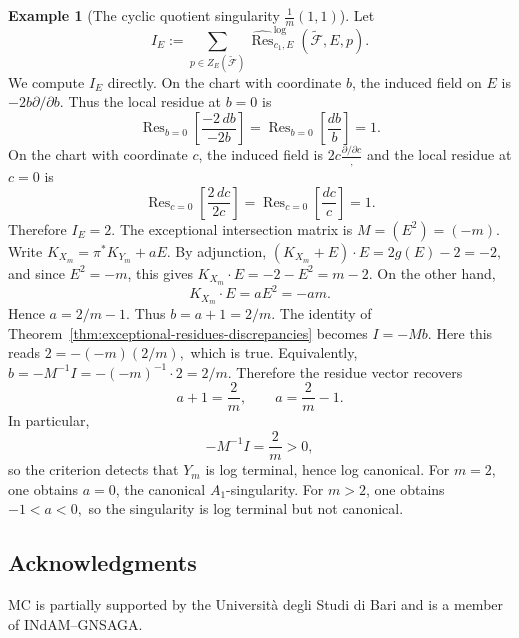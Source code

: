 \documentclass[12pt,reqno,a4paper]{amsart}
\numberwithin{equation}{section}
\theoremstyle{plain}
\theoremstyle{definition}
\newtheorem{example}[example]{Example}
\begin{document}
\begin{example}[The cyclic quotient singularity \(\frac{1}{m}(1,1)\)]
Let
\[
I_E:=
\sum_{p\in Z_E(\widetilde{\mathcal F})}
\widehat{\operatorname{Res}}^{\log}_{c_1,E}
(\widetilde{\mathcal F},E,p).
\]
We compute \(I_E\) directly. On the chart with coordinate \(b\), the induced
field on \(E\) is
$
-2b \partial/\partial b.
$
Thus the local residue at \(b=0\) is
\[
\operatorname{Res}_{b=0}
\left[
\frac{-2\,db}{-2b}
\right]
=
\operatorname{Res}_{b=0}\left[\frac{db}{b}\right]
=
1.
\]
On the chart with coordinate \(c\), the induced field is
$
2c\frac{\partial/\partial c},
$
and the local residue at \(c=0\) is
\[
\operatorname{Res}_{c=0}
\left[
\frac{2\,dc}{2c}
\right]
=
\operatorname{Res}_{c=0}\left[\frac{dc}{c}\right]
=
1.
\]
Therefore
$
I_E=2.$
The exceptional intersection matrix is
$
M=(E^2)=(-m).
$
Write
$
K_{X_m}=\pi^*K_{Y_m}+aE.
$
By adjunction,
$
(K_{X_m}+E)\cdot E=2g(E)-2=-2,
$
and since \(E^2=-m\), this gives
$
K_{X_m}\cdot E=-2-E^2=m-2.
$
On the other hand,
$$
K_{X_m}\cdot E
=
aE^2
=
-am.
$$
Hence
$
a=2/m-1.
$
Thus
$
b=a+1=2/m.
$
The identity of Theorem~\ref{thm:exceptional-residues-discrepancies} becomes
$
I=-Mb.
$
Here this reads
$
2=-(-m)(2/m),
$
which is true. Equivalently,
$
b=-M^{-1}I
=
-(-m)^{-1}\cdot 2
=
2/m.
$
Therefore the residue vector recovers
\[
a+1=\frac{2}{m},
\qquad
a=\frac{2}{m}-1.
\]
In particular,
\[
-M^{-1}I=\frac{2}{m}>0,
\]
so the criterion detects that \(Y_m\) is log terminal, hence log canonical. For
\(m=2\), one obtains \(a=0\), the canonical \(A_1\)-singularity. For \(m>2\),
one obtains
$
-1<a<0,$
so the singularity is log terminal but not canonical.
\end{example}

\subsection*{Acknowledgments}
MC is partially supported by the Universit\`a degli Studi di Bari and is a member of INdAM--GNSAGA.
					
\end{document}
